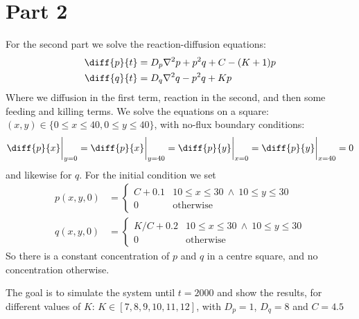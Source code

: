\documentclass[a4paper,10pt]{article}
\begin{document}
	\section*{Part 2}
	For the second part we solve the reaction-diffusion equations:
	\begin{align}
		\diff{p}{t} &= D_p \nabla^2 p + p^2q+C-(K+1)p \\
		\diff{q}{t} &= D_q \nabla^2 q - p^2q+Kp
	\end{align}
	Where we diffusion in the first term, reaction in the second, and then some feeding and killing terms. We solve the equations on a square: $(x,y) \in \{0\leq x \leq 40, 0\leq y\leq 40\} $, with no-flux boundary conditions:
	\begin{equation}
		\diff{p}{x}\bigg|_{y=0} = \diff{p}{x}\bigg|_{y=40} = \diff{p}{y}\bigg|_{x=0} = \diff{p}{y}\bigg|_{x=40} = 0
	\end{equation}
	and likewise for $ q $. For the initial condition we set
	\begin{align}
		p(x,y,0) &= \begin{cases}
		C+0.1 & 10 \leq x \leq 30\  \wedge \ 10 \leq y \leq 30 \\
		0 & \text{otherwise}
		\end{cases} \\
		q(x,y,0) &= \begin{cases}
		K/C+0.2 & 10 \leq x \leq 30\  \wedge \ 10 \leq y \leq 30 \\
		0 & \text{otherwise}
		\end{cases}
	\end{align}
	So there is a constant concentration of $ p $ and $ q $ in a centre square, and no concentration otherwise.
	
	The goal is to simulate the system until $ t=2000 $ and show the results, for different values of $ K $: $ K \in [7,8,9,10,11,12] $, with $ D_p = 1 $, $ D_q=8 $ and $ C=4.5 $
	
\end{document}
